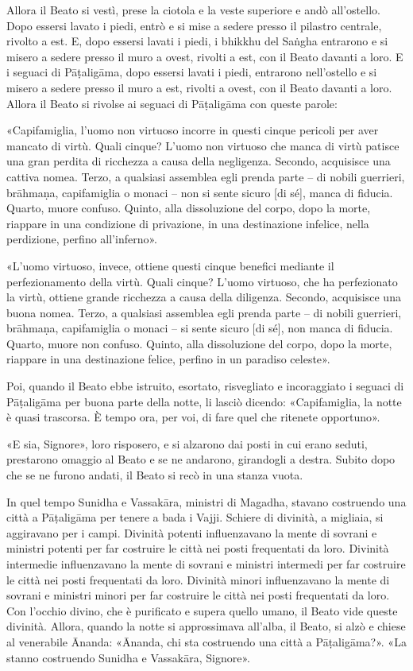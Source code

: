 Allora il Beato si vestì, prese la ciotola e la veste superiore e andò
all’ostello. Dopo essersi lavato i piedi, entrò e si mise a sedere presso il
pilastro centrale, rivolto a est. E, dopo essersi lavati i piedi, i bhikkhu del
Saṅgha entrarono e si misero a sedere presso il muro a ovest, rivolti a est, con
il Beato davanti a loro. E i seguaci di Pāṭaligāma, dopo essersi lavati i piedi,
entrarono nell’ostello e si misero a sedere presso il muro a est, rivolti a
ovest, con il Beato davanti a loro. Allora il Beato si rivolse ai seguaci di
Pāṭaligāma con queste parole:

«Capifamiglia, l’uomo non virtuoso incorre in questi cinque pericoli per aver
mancato di virtù. Quali cinque? L’uomo non virtuoso che manca di virtù patisce
una gran perdita di ricchezza a causa della negligenza. Secondo, acquisisce una
cattiva nomea. Terzo, a qualsiasi assemblea egli prenda parte – di nobili
guerrieri, brāhmaṇa, capifamiglia o monaci – non si sente sicuro [di sé], manca
di fiducia. Quarto, muore confuso. Quinto, alla dissoluzione del corpo, dopo la
morte, riappare in una condizione di privazione, in una destinazione infelice,
nella perdizione, perfino all’inferno».

«L’uomo virtuoso, invece, ottiene questi cinque benefici mediante il
perfezionamento della virtù. Quali cinque? L’uomo virtuoso, che ha perfezionato
la virtù, ottiene grande ricchezza a causa della diligenza. Secondo, acquisisce
una buona nomea. Terzo, a qualsiasi assemblea egli prenda parte – di nobili
guerrieri, brāhmaṇa, capifamiglia o monaci – si sente sicuro [di sé], non manca
di fiducia. Quarto, muore non confuso. Quinto, alla dissoluzione del corpo, dopo
la morte, riappare in una destinazione felice, perfino in un paradiso celeste».

Poi, quando il Beato ebbe istruito, esortato, risvegliato e incoraggiato i
seguaci di Pāṭaligāma per buona parte della notte, li lasciò dicendo:
«Capifamiglia, la notte è quasi trascorsa. È tempo ora, per voi, di fare quel
che ritenete opportuno».

«E sia, Signore», loro risposero, e si alzarono dai posti in cui erano seduti,
prestarono omaggio al Beato e se ne andarono, girandogli a destra. Subito dopo
che se ne furono andati, il Beato si recò in una stanza vuota.

In quel tempo Sunidha e Vassakāra, ministri di Magadha, stavano costruendo una
città a Pāṭaligāma per tenere a bada i Vajji. Schiere di divinità, a migliaia,
si aggiravano per i campi. Divinità potenti influenzavano la mente di sovrani e
ministri potenti per far costruire le città nei posti frequentati da loro.
Divinità intermedie influenzavano la mente di sovrani e ministri intermedi per
far costruire le città nei posti frequentati da loro. Divinità minori
influenzavano la mente di sovrani e ministri minori per far costruire le città
nei posti frequentati da loro. Con l’occhio divino, che è purificato e supera
quello umano, il Beato vide queste divinità. Allora, quando la notte si
approssimava all’alba, il Beato, si alzò e chiese al venerabile Ānanda: «Ānanda,
chi sta costruendo una città a Pāṭaligāma?». «La stanno costruendo Sunidha e
Vassakāra, Signore».

